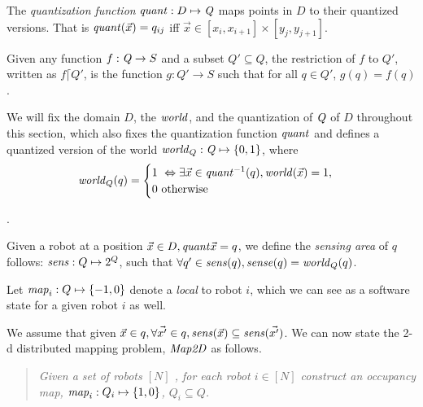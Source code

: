 \begin{definition}
    The \emph{quantization function}  $\mathit{quant}:D \mapsto \mathit{Q}$ maps points in $D$ to their quantized versions. 
    That is $\mathit{quant}(\Vec{x}) = q_{ij}$ iff $\Vec{x} \in [x_i, x_{i+1}] \times [y_j, y_{j+1}]$.
   \end{definition}

\begin{definition}
    Given any function $f:\mathit{Q} \rightarrow S$ and a subset $Q' \subseteq Q$, 
    the restriction of $f$ to $Q'$, written as $f \lceil Q'$, is the function
    $g:Q' \rightarrow S$ such that for all $q \in Q'$, $g(q) = f(q)$.
\end{definition}

We will fix the domain $D$, the $\mathit{world}$, and the quantization of $\mathit{Q}$ of $D$ throughout this section, which also fixes the quantization function $\mathit{quant}$ and defines a quantized version of the world $\mathit{world}_Q : \mathit{Q} \mapsto \left\{0,1\right\}$, where
$$\mathit{world}_Q(q) = \begin{cases}
        1\ \Leftrightarrow \exists \Vec{x}\in \mathit{quant}^{-1}(q), \mathit{world}(\Vec{x}) = 1, \\
        0\ \mbox{otherwise}
\end{cases}
$$


.



\begin{definition}
   Given a robot at a position $\Vec{x}\in D, \mathit{quant}{\Vec{x}} = q$, we define the \emph{sensing area} of $q$ follows: $\mathit{sens}: Q \mapsto 2^{Q}$, such that  $\forall q^\prime \in \mathit{sens}(q), \mathit{sense}(q) = \mathit{world}_Q(q)$.  \end{definition}


Let $\mathit{map}_i:Q\mapsto \left\{-1,0\right\}$ denote a \qdfunc \emph{local} to robot $i$, which we can see as a software state for a given robot $i$ as well.  %



We assume that given $\Vec{x} \in q, \forall \Vec{x^\prime} \in q, \mathit{sens}(\Vec{x}) \subseteq \mathit{sens}(\Vec{x^\prime})$. We can now state the 2-d distributed mapping problem, $\mathit{Map2D}$ as follows. \begin{quote}
{\em Given a set of robots $[N]$ , for each robot $i \in [N]$ construct an \emph{occupancy map}, $\mathit{map}_i: Q_i \mapsto \left\{1,0\right\}$, $Q_i\subseteq Q$.
}
\end{quote}

